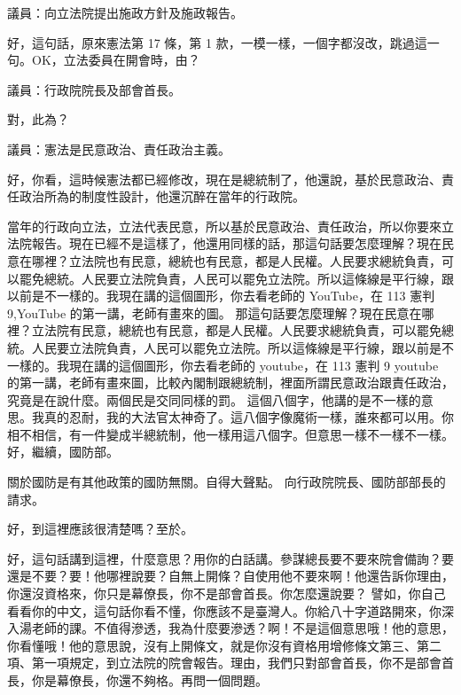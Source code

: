 \hypertarget{c08:cue:193}{}議員：向立法院提出施政方針及施政報告。\par{}好，這句話，原來憲法第 17 條，第 1 款，一模一樣，一個字都沒改，跳過這一句。OK，立法委員在開會時，由？

\hypertarget{c08:cue:194}{}議員：行政院院長及部會首長。\par{}對，此為？\par{}議員：憲法是民意政治、責任政治主義。\par{}好，你看，這時候憲法都已經修改，現在是總統制了，他還說，基於民意政治、責任政治所為的制度性設計，他還沉醉在當年的行政院。

\hypertarget{c08:cue:195}{}當年的行政向立法，立法代表民意，所以基於民意政治、責任政治，所以你要來立法院報告。現在已經不是這樣了，他還用同樣的話，那這句話要怎麼理解？現在民意在哪裡？立法院也有民意，總統也有民意，都是人民權。人民要求總統負責，可以罷免總統。人民要立法院負責，人民可以罷免立法院。所以這條線是平行線，跟以前是不一樣的。我現在講的這個圖形，你去看老師的 YouTube，在 113 憲判 9,YouTube 的第一講，老師有畫來的圖。
\hypertarget{c08:cue:196}{}那這句話要怎麼理解？現在民意在哪裡？立法院有民意，總統也有民意，都是人民權。人民要求總統負責，可以罷免總統。人民要立法院負責，人民可以罷免立法院。所以這條線是平行線，跟以前是不一樣的。我現在講的這個圖形，你去看老師的 youtube，在 113 憲判 9 youtube 的第一講，老師有畫來圖，比較內閣制跟總統制，裡面所謂民意政治跟責任政治，究竟是在說什麼。兩個民是交同同樣的罰。
\hypertarget{c08:cue:197}{}這個八個字，他講的是不一樣的意思。我真的忍耐，我的大法官太神奇了。這八個字像魔術一樣，誰來都可以用。你相不相信，有一件變成半總統制，他一樣用這八個字。但意思一樣不一樣不一樣。好，繼續，國防部。

\hypertarget{c08:cue:198}{}關於國防是有其他政策的國防無關。自得大聲點。
\hypertarget{c08:cue:199}{}向行政院院長、國防部部長的請求。

\hypertarget{c08:cue:200}{}好，到這裡應該很清楚嗎？至於。

\hypertarget{c08:cue:201}{}好，這句話講到這裡，什麼意思？用你的白話講。參謀總長要不要來院會備詢？要還是不要？要！他哪裡說要？自無上開條？自使用他不要來啊！他還告訴你理由，你還沒資格來，你只是幕僚長，你不是部會首長。你怎麼還說要？
\hypertarget{c08:cue:202}{}譬如，你自己看看你的中文，這句話你看不懂，你應該不是臺灣人。你給八十字道路開來，你深入湯老師的課。不值得滲透，我為什麼要滲透？啊！不是這個意思哦！他的意思，你看懂哦！他的意思說，沒有上開條文，就是你沒有資格用增修條文第三、第二項、第一項規定，到立法院的院會報告。理由，我們只對部會首長，你不是部會首長，你是幕僚長，你還不夠格。再問一個問題。

